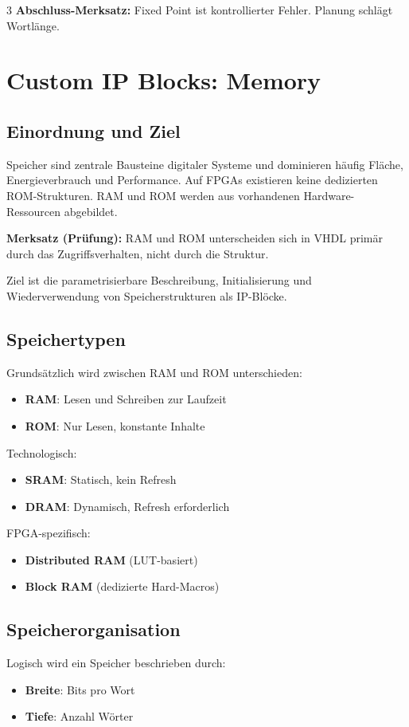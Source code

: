 \documentclass[10pt,a4paper]{article}
\newcommand{\hilite}[1]{\colorbox{yellow!25}{#1}}
\newcommand{\imp}[1]{\textbf{\textcolor{codeemph}{#1}}}
\begin{document}
\begin{multicols}{3}
\imp{Abschluss-Merksatz:}  
\hilite{Fixed Point} ist \hilite{kontrollierter Fehler}.  
Planung schlägt Wortlänge.

\section{Custom IP Blocks: Memory}

\subsection{Einordnung und Ziel}
Speicher sind zentrale Bausteine digitaler Systeme und dominieren häufig Fläche, Energieverbrauch und Performance.  
Auf FPGAs existieren keine dedizierten ROM-Strukturen. RAM und ROM werden aus vorhandenen Hardware-Ressourcen abgebildet.

\imp{Merksatz (Prüfung):}  
\hilite{RAM} und \hilite{ROM} \hilite{unterscheiden} sich in VHDL primär durch das Zugriffsverhalten, nicht durch die Struktur.

Ziel ist die parametrisierbare Beschreibung, Initialisierung und Wiederverwendung von Speicherstrukturen als IP-Blöcke.

\subsection{Speichertypen}
Grundsätzlich wird zwischen RAM und ROM unterschieden:
\begin{itemize}
  \item \textbf{RAM}: Lesen und Schreiben zur Laufzeit
  \item \textbf{ROM}: Nur Lesen, konstante Inhalte
\end{itemize}

Technologisch:
\begin{itemize}
  \item \textbf{SRAM}: Statisch, kein Refresh
  \item \textbf{DRAM}: Dynamisch, Refresh erforderlich
\end{itemize}

FPGA-spezifisch:
\begin{itemize}
  \item \textbf{Distributed RAM} (LUT-basiert)
  \item \textbf{Block RAM} (dedizierte Hard-Macros)
\end{itemize}

\subsection{Speicherorganisation}
Logisch wird ein Speicher beschrieben durch:
\begin{itemize}
  \item \textbf{Breite}: Bits pro Wort
  \item \textbf{Tiefe}: Anzahl Wörter
\end{itemize}


\end{multicols}
\end{document}
